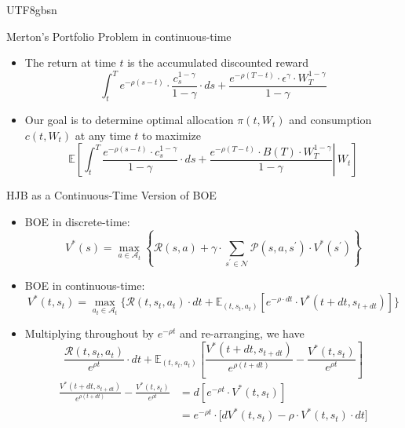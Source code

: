 \documentclass[UTF8, 10pt]{beamer}
\begin{document}
\begin{CJK*}{UTF8}{gbsn}
\begin{frame}{Merton's Portfolio Problem in continuous-time}
\begin{itemize}
$$\begin{array}{l}
				U(c_t)=\frac{c_t^{1-\gamma}}{1-\gamma}, \quad t<T
				\\
				B(T)\cdot U(W_t)=\varepsilon^{\gamma}\cdot \frac{W_t^{1-\gamma}}{1-\gamma}, \quad t=T
			\end{array}
			\right.
			$$
		\item The return at time $t$ is the accumulated discounted reward
			$$
			\int_{t}^{T} e^{-\rho(s-t)} \cdot \frac{c_{s}^{1-\gamma}}{1-\gamma} \cdot d s+\frac{e^{-\rho(T-t)} \cdot \epsilon^{\gamma} \cdot W_{T}^{1-\gamma}}{1-\gamma}
			$$
		\item Our goal is to determine optimal allocation $\pi(t,W_t)$ and consumption $c(t, W_t)$ at any time $t$ to maximize
			$$
			\mathbb{E}\left[\left.\int_{t}^{T} \frac{e^{-\rho(s-t)} \cdot c_{s}^{1-\gamma}}{1-\gamma} \cdot d s+\frac{e^{-\rho(T-t)} \cdot B(T) \cdot W_{T}^{1-\gamma}}{1-\gamma} \right\rvert\, W_{t}\right]
			$$
	\end{itemize}
\end{frame}
\begin{frame}{HJB as a Continuous-Time Version of BOE}
	\begin{itemize}
		\item BOE in discrete-time:
			$$
			V^{*}(s)=\max _{a\in \mathcal{A}_t}\left\{\mathcal{R}(s, a)+\gamma \cdot \sum_{s^{\prime} \in \mathcal{N}} \mathcal{P}\left(s, a, s^{\prime}\right) \cdot V^{*}\left(s^{\prime}\right)\right\}
			$$
		\item BOE in continuous-time:
			$$
			V^{*}\left(t, s_{t}\right)=\max _{a_{t}\in \mathcal{A}_t}\Bigg\{\mathcal{R}\left(t, s_{t}, a_{t}\right) \cdot d t+\mathbb{E}_{\left(t, s_{t}, a_{t}\right)}\left[e^{-\rho \cdot d t} \cdot V^{*}\left(t+d t, s_{t+d t}\right)\right]\Bigg\}
			$$
		\item Multiplying throughout by $e^{-\rho t}$ and re-arranging, we have
			$$
			\frac{\mathcal{R}\left(t, s_{t}, a_{t}\right)}{e^{\rho t}} \cdot d t
			+\mathbb{E}_{\left(t, s_{t}, a_{t}\right)}
			\left[
				\frac{V^{*}\left(t+d t, s_{t+d t}\right)}{e^{\rho(t+d t)}}
				-\frac{V^{*}\left(t, s_{t}\right)}{e^{\rho t} }
			\right]
			$$
			$$
			\begin{aligned}
				\frac{V^{*}\left(t+d t, s_{t+d t}\right)}{e^{\rho(t+d t)}}-\frac{V^{*}\left(t, s_{t}\right)}{e^{\rho t} }
				&=d\left[e^{-\rho t} \cdot V^{*}\left(t, s_{t}\right)\right]
				\\&=
				e^{-\rho t} \cdot\Big[d V^{*}\left(t, s_{t}\right)
				-\rho \cdot V^{*}\left(t, s_{t}\right) \cdot d t\Big]
			\end{aligned}
$$
\end{itemize}
\end{frame}
\end{CJK*}
\end{document}
